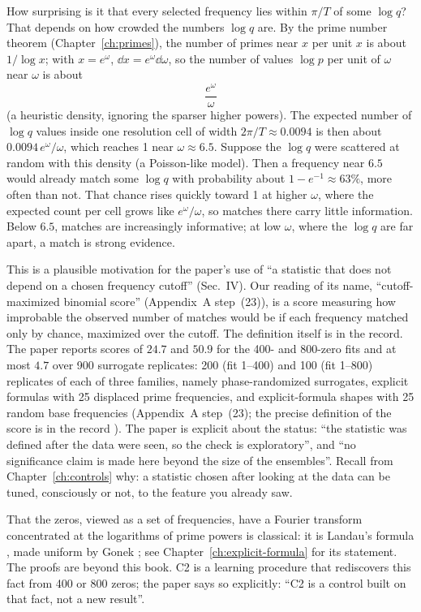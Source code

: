 How surprising is it that every selected frequency lies within $\pi/T$ of some $\log q$? That depends on how crowded the numbers $\log q$ are. By the prime number theorem (Chapter~\ref{ch:primes}), the number of primes near $x$ per unit $x$ is about $1/\log x$; with $x=e^\omega$, $\dd x=e^\omega\dd\omega$, so the number of values $\log p$ per unit of $\omega$ near $\omega$ is about
\begin{equation}
\frac{e^\omega}{\omega}
\end{equation}
(a heuristic density, ignoring the sparser higher powers). The expected number of $\log q$ values inside one resolution cell of width $2\pi/T\approx0.0094$ is then about $0.0094\,e^\omega/\omega$, which reaches 1 near $\omega\approx6.5$. Suppose the $\log q$ were scattered at random with this density (a Poisson-like model). Then a frequency near $6.5$ would already match some $\log q$ with probability about $1-e^{-1}\approx63\%$, more often than not. That chance rises quickly toward 1 at higher $\omega$, where the expected count per cell grows like $e^\omega/\omega$, so matches there carry little information. Below $6.5$, matches are increasingly informative; at low $\omega$, where the $\log q$ are far apart, a match is strong evidence.

This is a plausible motivation for the paper's use of ``a statistic that does not depend on a chosen frequency cutoff'' (Sec.~IV). Our reading of its name, ``cutoff-maximized binomial score'' (Appendix~A step~(23)), is a score measuring how improbable the observed number of matches would be if each frequency matched only by chance, maximized over the cutoff. The definition itself is in the record. The paper reports scores of $24.7$ and $50.9$ for the 400- and 800-zero fits and at most $4.7$ over 900 surrogate replicates: 200 (fit 1--400) and 100 (fit 1--800) replicates of each of three families, namely phase-randomized surrogates, explicit formulas with 25 displaced prime frequencies, and explicit-formula shapes with 25 random base frequencies (Appendix~A step~(23); the precise definition of the score is in the record \cite{zenodo}). The paper is explicit about the status: ``the statistic was defined after the data were seen, so the check is exploratory'', and ``no significance claim is made here beyond the size of the ensembles''. Recall from Chapter~\ref{ch:controls} why: a statistic chosen after looking at the data can be tuned, consciously or not, to the feature you already saw.

\begin{beyond}
That the zeros, viewed as a set of frequencies, have a Fourier transform concentrated at the logarithms of prime powers is classical: it is Landau's formula \cite{landau}, made uniform by Gonek \cite{gonek}; see Chapter~\ref{ch:explicit-formula} for its statement. The proofs are beyond this book. C2 is a learning procedure that rediscovers this fact from 400 or 800 zeros; the paper says so explicitly: ``C2 is a control built on that fact, not a new result''.
\end{beyond}

